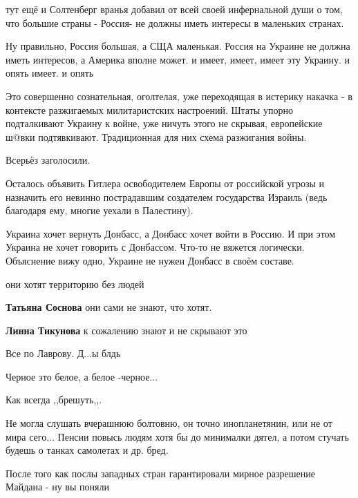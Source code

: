 \begin{itemize}

тут ещё и Солтенберг вранья добавил от всей своей инфернальной души о том, что
большие страны - Россия- не должны иметь интересы в маленьких странах.

Ну правильно, Россия большая, а СЩА маленькая. Россия на Украине не должна
иметь интересов, а Америка вполне может. и имеет, имеет, имеет эту Украину. и
опять имеет. и опять


Это совершенно сознательная, оголтелая, уже переходящая в истерику накачка - в
контексте разжигаемых милитаристских настроений. Штаты упорно подталкивают
Украину к войне, уже ничуть этого не скрывая, европейские ш@вки подтявкивают.
Традиционная для них схема разжигания войны.

Всерьёз заголосили.


Осталось объявить Гитлера освободителем Европы от российской угрозы и назначить
его невинно пострадавшим создателем государства Израиль (ведь благодаря ему,
многие уехали в Палестину).



Украина хочет вернуть Донбасс, а Донбасс хочет войти в Россию. И при этом
Украина не хочет говорить с Донбассом. Что-то не вяжется логически. Объяснение
вижу одно, Украине не нужен Донбасс в своём составе.

\begin{itemize} %
они хотят территорию без людей

\textbf{Татьяна Соснова} они сами не знают, что хотят.

\textbf{Линна Тикунова} к сожалению знают и не скрывают это
\end{itemize} %

Все по Лаврову. Д...ы блдь

Черное это белое, а белое -черное...

Как всегда ,,брешуть,,.

Не могла слушать вчерашнюю болтовню, он точно инопланетянин, или не от мира
сего... Пенсии повысь людям хотя бы до минималки дятел, а потом стучать будешь о
танках самолетах и др. бред.


После того как послы западных стран гарантировали мирное разрешение Майдана - ну вы поняли


\end{itemize}
